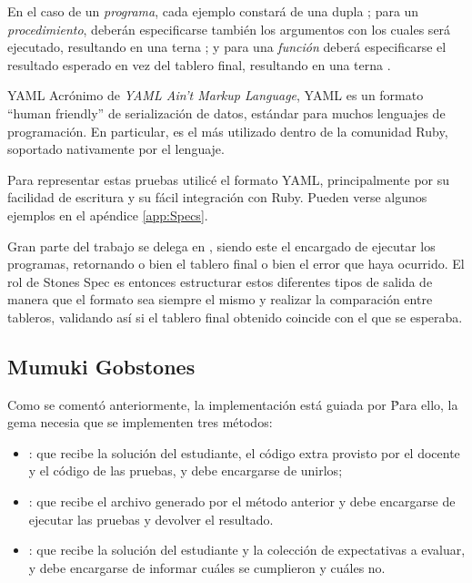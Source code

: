 En el caso de un \emph{programa}, cada ejemplo constará de una dupla ; para un \emph{procedimiento}, deberán especificarse también los argumentos con los cuales será ejecutado, resultando en una terna ; y para una \emph{función} deberá especificarse el resultado esperado en vez del tablero final, resultando en una terna .

\sepfootnotecontent
  {YAML}
  {Acrónimo de \emph{YAML Ain't Markup Language}, YAML es un formato ``human friendly'' de serialización de datos, estándar para muchos lenguajes de programación. En particular, es el más utilizado dentro de la comunidad Ruby, soportado nativamente por el lenguaje.}

Para representar estas pruebas utilicé el formato YAML, principalmente por su facilidad de escritura y su fácil integración con Ruby. Pueden verse algunos ejemplos en el apéndice \ref{app:Specs}.

Gran parte del trabajo se delega en \pyGob, siendo este el encargado de ejecutar los programas, retornando o bien el tablero final o bien el error que haya ocurrido. El rol de Stones Spec es entonces estructurar estos diferentes tipos de salida de manera que el formato sea siempre el mismo y realizar la comparación entre tableros, validando así si el tablero final obtenido coincide con el que se esperaba.

\subsection{Mumuki Gobstones \runner}
Como se comentó anteriormente, la implementación está guiada por \mumukit\. Para ello, la gema necesia que se implementen tres métodos:
\begin{itemize}
  \item{: que recibe la solución del estudiante, el código extra provisto por el docente y el código de las pruebas, y debe encargarse de unirlos;}
  \item{: que recibe el archivo generado por el método anterior y debe encargarse de ejecutar las pruebas y devolver el resultado.}
  \item{: que recibe la solución del estudiante y la colección de expectativas a evaluar, y debe encargarse de informar cuáles se cumplieron y cuáles no.}
\end{itemize}

